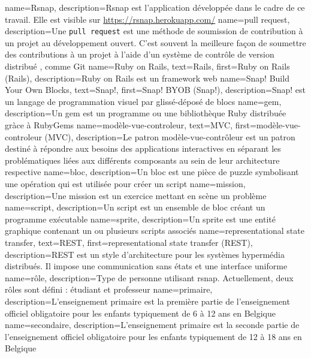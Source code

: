 

{
 name=Rsnap,
 description={Rsnap \cite{rsnap} est l'application développée dans le cadre de ce travail. Elle est visible sur \url{https://rsnap.herokuapp.com/}}
}
{
 name={pull request},
 description={Une \texttt{pull request} est une méthode de soumission de contribution à un projet au développement ouvert. C'est  souvent la meilleure façon de soumettre des contributions à un projet à l'aide d'un système de contrôle de version distribué , comme Git}
}
{
 name={Ruby on Rails},
 text={Rails},
 first={Ruby on Rails (Rails)},
 description={Ruby on Rails \cite{rails} est un framework web}
}
{
 name={Snap! Build Your Own Blocks},
 text={Snap!},
 first={Snap! BYOB (Snap!)},
 description={Snap! \cite{snap} est un langage de programmation visuel par glissé-déposé de \glspl{bloc}}
}
{
 name={gem},
 description={Un gem \cite{gem} est un programme ou une bibliothèque Ruby distribuée gràce à RubyGems}
}
{
 name={modèle-vue-controleur},
 text={MVC},
 first={modèle-vue-controleur (MVC)},
 description={Le patron modèle-vue-contrôleur \cite{wiki-mvc} est un patron destiné à répondre aux besoins des applications interactives en séparant les problématiques liées aux différents composants au sein de leur architecture respective}
}
{
 name={bloc},
 description={Un bloc est une pièce de puzzle symbolisant une opération qui est utilisée pour créer un \gls{script}}
}
{
 name={mission},
 description={Une mission est un exercice mettant en scène un problème}
}
{
 name={script},
 description={Un script est un ensemble de bloc créant un programme exécutable}
}
{
 name={sprite},
 description={Un sprite est une entité graphique contenant un ou plusieurs scripts associés}
}
{
 name={representational state transfer},
 text={REST},
 first={representational state transfer (REST)},
 description={REST est un style d’architecture pour les systèmes hypermédia distribués. Il impose une communication sans états et une interface uniforme}
}
{
 name={rôle},
 description={Type de personne utilisant \gls{rsnap}. Actuellement, deux rôles sont défini : étudiant et professeur}
}
{
 name={primaire},
 description={L'enseignement primaire est la première partie de l'enseignement officiel obligatoire pour les enfants typiquement de 6 à 12 ans en Belgique}
}
{
 name={secondaire},
 description={L'enseignement primaire est la seconde partie de l'enseignement officiel obligatoire pour les enfants typiquement de 12 à 18 ans en Belgique}
}
